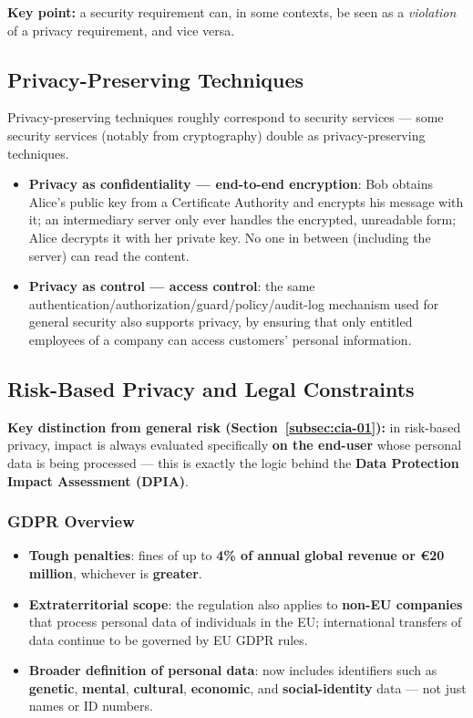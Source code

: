 \documentclass[12pt, a4paper]{article}
\begin{document}
\textcolor{red!70!black}{\textbf{Key point:}} a security requirement can, in some contexts, be seen as a \emph{violation} of a privacy requirement, and vice versa.

\subsection{Privacy-Preserving Techniques}

Privacy-preserving techniques roughly correspond to security services — some security services (notably from cryptography) double as privacy-preserving techniques.

\begin{itemize}
    \item \textbf{Privacy as confidentiality — end-to-end encryption}: Bob obtains Alice's public key from a Certificate Authority and encrypts his message with it; an intermediary server only ever handles the encrypted, unreadable form; Alice decrypts it with her private key. No one in between (including the server) can read the content.
    \item \textbf{Privacy as control — access control}: the same authentication/authorization/guard/policy/audit-log mechanism used for general security also supports privacy, by ensuring that only entitled employees of a company can access customers' personal information.
\end{itemize}

\subsection{Risk-Based Privacy and Legal Constraints}

\textcolor{blue!50!black}{\textbf{Key distinction from general risk (Section~\ref{subsec:cia-01}):}} in risk-based privacy, impact is always evaluated specifically \textbf{on the end-user} whose personal data is being processed — this is exactly the logic behind the \textbf{Data Protection Impact Assessment (DPIA)}.

\subsubsection{GDPR Overview}
\begin{itemize}
    \item \textbf{Tough penalties}: fines of up to \textbf{4\% of annual global revenue or €20 million}, whichever is \textbf{greater}.
    \item \textbf{Extraterritorial scope}: the regulation also applies to \textbf{non-EU companies} that process personal data of individuals in the EU; international transfers of data continue to be governed by EU GDPR rules.
    \item \textbf{Broader definition of personal data}: now includes identifiers such as \textbf{genetic}, \textbf{mental}, \textbf{cultural}, \textbf{economic}, and \textbf{social-identity} data — not just names or ID numbers.
\end{itemize}
\end{document}

